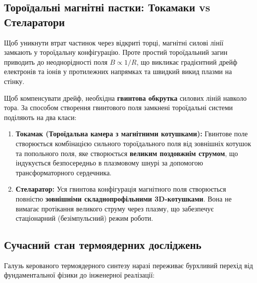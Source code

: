 \subsection{Тороїдальні магнітні пастки: Токамаки vs Стеларатори}

Щоб уникнути втрат частинок через відкриті торці, магнітні силові лінії замкають у тороїдальну конфігурацію. Проте простий тороїдальний загин приводить до неоднорідності поля $B \propto 1/R$, що викликає градієнтний дрейф електронів та іонів у протилежних напрямках та швидкий викид плазми на стінку.

Щоб компенсувати дрейф, необхідна \textbf{гвинтова обкрутка} силових ліній навколо тора. За способом створення гвинтового поля замкнені тороїдальні системи поділяють на два класи:

\begin{enumerate}
	\item \textbf{Токамак (Тороїдальна камера з магнітними котушками):}
	Гвинтове поле створюється комбінацією сильного тороїдального поля від зовнішніх котушок та попольного поля, яке створюється \textbf{великим поздовжнім струмом}, що індукується безпосередньо в плазмовому шнурі за допомогою трансформаторного сердечника.

	\item \textbf{Стеларатор:}
	Уся гвинтова конфігурація магнітного поля створюється повністю \textbf{зовнішніми складнопрофільними 3D-котушками}. Вона не вимагає протікання великого струму через плазму, що забезпечує стаціонарний (безімпульсний) режим роботи.
\end{enumerate}

\subsection{Сучасний стан термоядерних досліджень}

Галузь керованого термоядерного синтезу наразі переживає бурхливий перехід від фундаментальної фізики до інженерної реалізації:

